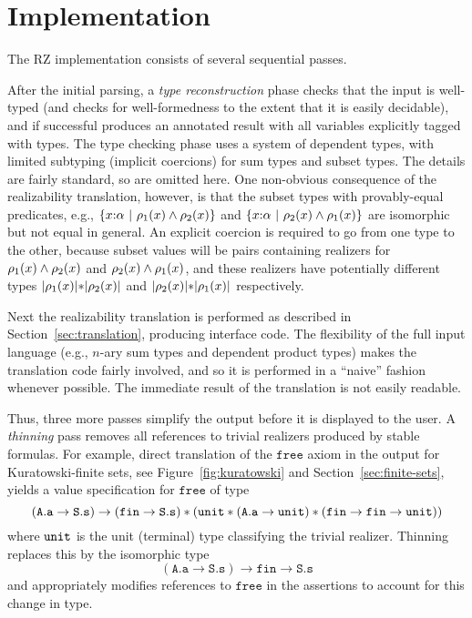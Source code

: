 \section{Implementation}
\label{sec:implementation}

The RZ implementation consists of several sequential passes.

After the initial parsing, a \emph{type reconstruction} phase checks
that the input is well-typed (and checks for well-formedness to the
extent that it is easily decidable), and if successful produces an
annotated result with all variables explicitly tagged with types. The
type checking phase uses a system of dependent types, with limited
subtyping (implicit coercions) for sum types and subset types. 
\iflong
The
details are fairly standard, so are omitted here. One non-obvious
consequence of the realizability translation, however, is that the
subset types with provably-equal predicates, e.g.,
$\{x{:}\alpha\ |\ \rho_1(x)\land \rho_2(x)\}$ and
$\{x{:}\alpha\ |\ \rho_2(x)\land \rho_1(x)\}$ are isomorphic
but not equal in general. An
explicit coercion is required to go from one type to the other,
because subset values will be pairs containing realizers for
$\rho_1(x)\land \rho_2(x)$ and
$\rho_2(x)\land \rho_1(x)$, and these realizers have
potentially different types $|\rho_1(x)|\mathtt{*}|\rho_2(x)|$ and
$|\rho_2(x)|\mathtt{*}|\rho_1(x)|$ respectively.
\fi %

Next the realizability translation is performed as described in
Section~\ref{sec:translation}, producing interface code. The
flexibility of the full input language (e.g., $n$-ary sum types and
dependent product types) makes the translation code fairly involved,
and so it is performed in a ``naive'' fashion whenever possible. The
immediate result of the translation is not easily readable.
 
Thus, three more passes simplify the output before it is displayed to
the user. A \emph{thinning} pass removes all references to trivial
realizers produced by stable formulas.
\iflong
For example, direct translation
of the $\mathtt{free}$ axiom in the output for Kuratowski-finite sets,
see Figure~\ref{fig:kuratowski} and Section~\ref{sec:finite-sets},
yields a value specification for $\mathtt{free}$ of type
%
\begin{equation*}
  (\mathtt{A.a} \to \mathtt{S.s}) \to 
  (\mathtt{fin} \to \mathtt{S.s}) * (\mathtt{unit} * (\mathtt{A.a} \to
  \mathtt{unit}) *
  (\mathtt{fin} \to \mathtt{fin} \to \mathtt{unit}))
\end{equation*}
%
where $\mathtt{unit}$ is the unit (terminal) type classifying the trivial
realizer. Thinning replaces this by the isomorphic type
%
\begin{equation*}
  (\mathtt{A.a} \to \mathtt{S.s}) \to \mathtt{fin} \to \mathtt{S.s}
\end{equation*}
%
and appropriately modifies references to $\mathtt{free}$ in the assertions to account for this change in type.

